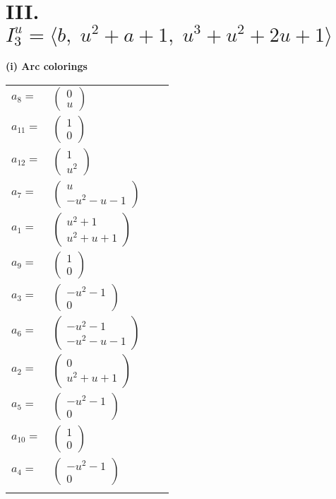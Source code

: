\documentclass[1p]{elsarticle_modified}
\theoremstyle{definition}
\begin{document}
\centering \section*{III. $I^u_{3}= \langle b,\;u^2+a+1,\;u^3+u^2+2 u+1 \rangle$}
\flushleft \textbf{(i) Arc colorings}\\
\begin{tabular}{m{7pt} m{180pt} m{7pt} m{180pt} }
\flushright $a_{8}=$&$\begin{pmatrix}0\\u\end{pmatrix}$ \\
\flushright $a_{11}=$&$\begin{pmatrix}1\\0\end{pmatrix}$ \\
\flushright $a_{12}=$&$\begin{pmatrix}1\\u^2\end{pmatrix}$ \\
\flushright $a_{7}=$&$\begin{pmatrix}u\\- u^2- u-1\end{pmatrix}$ \\
\flushright $a_{1}=$&$\begin{pmatrix}u^2+1\\u^2+u+1\end{pmatrix}$ \\
\flushright $a_{9}=$&$\begin{pmatrix}1\\0\end{pmatrix}$ \\
\flushright $a_{3}=$&$\begin{pmatrix}- u^2-1\\0\end{pmatrix}$ \\
\flushright $a_{6}=$&$\begin{pmatrix}- u^2-1\\- u^2- u-1\end{pmatrix}$ \\
\flushright $a_{2}=$&$\begin{pmatrix}0\\u^2+u+1\end{pmatrix}$ \\
\flushright $a_{5}=$&$\begin{pmatrix}- u^2-1\\0\end{pmatrix}$ \\
\flushright $a_{10}=$&$\begin{pmatrix}1\\0\end{pmatrix}$ \\
\flushright $a_{4}=$&$\begin{pmatrix}- u^2-1\\0\end{pmatrix}$\\&\end{tabular}
\end{document}
